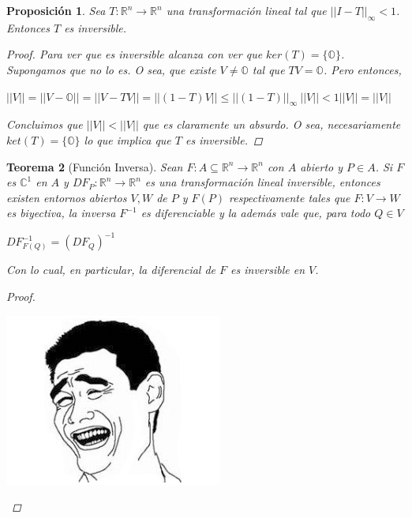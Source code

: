 \documentclass[]{article}
\newtheorem{teo}{Teorema}
\newtheorem{prop}[teo]{Proposición}
\def\R{\mathbb{R}}
\begin{document}
\begin{prop}
	Sea $T:\R^n\to\R^n$ una transformación lineal tal que $||I-T||_{\infty} < 1$. Entonces $T$ es inversible.
	\begin{proof}
		Para ver que es inversible alcanza con ver que $ker(T) = \{\mathds{O}\}$. Supongamos que no lo es. O sea, que existe $V\neq \mathds{O}$ tal que $TV = \mathds{O}$. Pero entonces, 
		\begin{center}
			$||V|| = ||V - \mathds{O}|| = ||V-TV|| = ||(1-T)V|| \leq ||(1-T)||_{\infty}\ ||V|| < 1||V|| = ||V||$ 
		\end{center}
		Concluimos que $||V||<||V||$ que es claramente un absurdo. O sea, necesariamente $ket(T) = \{\mathds{O}\}$ lo que implica que $T$ es inversible.
	\end{proof}
\end{prop}

\begin{teo}[Función Inversa]
	Sean $F:A\subseteq \R^n\to\R^n$ con $A$ abierto y $P\in A$. Si $F$ es $\mathds{C}^1$ en $A$ y $DF_P:\R^n\to\R^n$ es una transformación lineal inversible, entonces existen entornos abiertos $V,W$ de $P$ y $F(P)$ respectivamente tales que $F:V\to W$ es biyectiva, la inversa $F^{-1}$ es diferenciable y la además vale que, para todo $Q\in V$
	\begin{center}
		$DF^{-1}_{F(Q)} = (DF_Q)^{-1}$
	\end{center}
	Con lo cual, en particular, la diferencial de $F$ es inversible en $V$.
	\begin{proof}
		~\newline
		\begin{center}
			\includegraphics[scale=0.50]{YMM.jpg}
		\end{center}
	\end{proof}
\end{teo}
\end{document}
